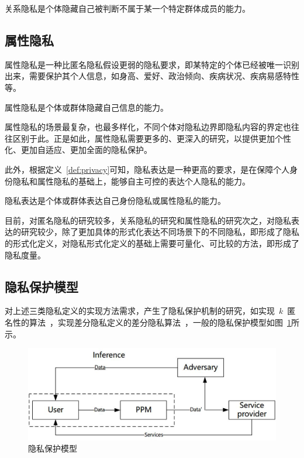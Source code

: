\begin{definition}
	关系隐私是个体隐藏自己被判断不属于某一个特定群体成员的能力。
\end{definition}

\subsection{属性隐私}
属性隐私是一种比匿名隐私假设更弱的隐私要求，即某特定的个体已经被唯一识别出来，需要保护其个人信息，如身高、爱好、政治倾向、疾病状况、疾病易感特性等。

\begin{definition}
	属性隐私是个体或群体隐藏自己信息的能力。
\end{definition}

属性隐私的场景最复杂，也最多样化，不同个体对隐私边界即隐私内容的界定也往往区别于此。正是如此，属性隐私需要更多的、更深入的研究，以提供更加个性化、更加自适应、更加全面的隐私保护。


此外，根据定义~\ref{def:privacy}可知，隐私表达是一种更高的要求，是在保障个人身份隐私和属性隐私的基础上，能够自主可控的表达个人隐私的能力。
\begin{definition}
	隐私表达是个体或群体表达自己身份隐私或属性隐私的能力。
\end{definition}



目前，对匿名隐私的研究较多，关系隐私的研究和属性隐私的研究次之，对隐私表达的研究较少，除了更加具体的形式化表达不同场景下的不同隐私，即形成了隐私的形式化定义，对隐私形式化定义的基础上需要可量化、可比较的方法，即形成了隐私度量。

\subsection{隐私保护模型}

对上述三类隐私定义的实现方法需求，产生了隐私保护机制的研究，如实现~$k$~匿名性的算法~\cite{sweeney2002k}，实现差分隐私定义的差分隐私算法~\cite{dwork2006differential}，一般的隐私保护模型如图~\ref{fig:ppm-model}所示。

\begin{figure}[htbp]
	\centering
	\includegraphics[width = 0.6\linewidth]{./figures/cha1-ppm.jpg}
	\caption{隐私保护模型}
	\label{fig:ppm-model}
\end{figure}

